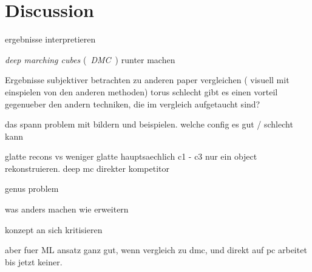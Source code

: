 \chapter{Discussion}
\label{sec:dicussion}
ergebnisse interpretieren

\emph{deep marching cubes} (~\emph{DMC}~) runter machen

Ergebnisse subjektiver betrachten
zu anderen paper vergleichen ( visuell mit einspielen von den anderen methoden)
torus schlecht
gibt es einen vorteil gegenueber den andern techniken, die im vergleich aufgetaucht sind?

das spann problem mit bildern und beispielen. welche config es gut / schlecht kann

glatte recons vs weniger glatte hauptsaechlich c1 - c3
nur ein object rekonstruieren.
deep mc direkter kompetitor


genus problem

was anders machen
wie erweitern

konzept an sich kritisieren

aber fuer ML ansatz ganz gut, wenn vergleich zu dmc, und 
direkt auf pc arbeitet bis jetzt keiner.